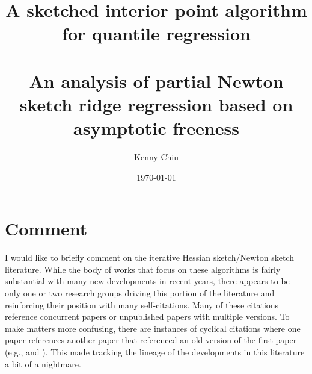 \documentclass[12pt]{article}
\title{A sketched interior point algorithm for quantile regression\\\vspace{0.25em}{\large and}\\\vspace{0.25em}An analysis of partial Newton sketch ridge regression based on asymptotic freeness\vspace{0.25em}} %
\author{Kenny Chiu} %
\date{\today} %
\begin{document}
\maketitle








\newpage


\section{Comment}

I would like to briefly comment on the iterative Hessian sketch/Newton sketch literature. While the body of works that focus on these algorithms is fairly substantial with many new developments in recent years, there appears to be only one or two research groups driving this portion of the literature and reinforcing their position with many self-citations. Many of these citations reference concurrent papers or unpublished papers with multiple versions. To make matters more confusing, there are instances of cyclical citations where one paper references another paper that referenced an old version of the first paper (e.g., \citep{Lacotte:2020} and \citep{Lacotte:2020b}). This made tracking the lineage of the developments in this literature a bit of a nightmare.


\newpage




\end{document}
